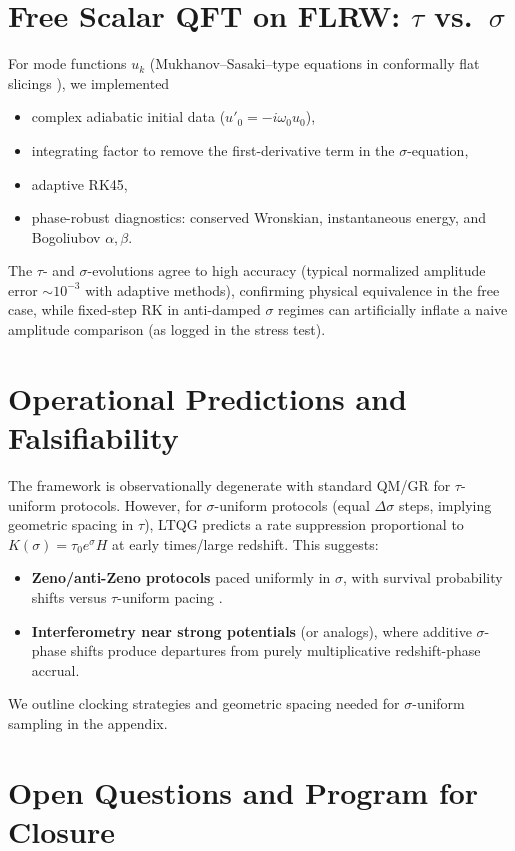 \documentclass[11pt]{article}
\begin{document}
\section{Free Scalar QFT on FLRW: $\tau$ vs.\ $\sigma$}
For mode functions \(u_k\) (Mukhanov–Sasaki–type equations in conformally flat slicings \cite{BirrellDavies,ParkerToms,WaldQFTCST}),
we implemented
\begin{itemize}
\item complex adiabatic initial data (\(u'_0=-i\omega_0 u_0\)),
\item integrating factor to remove the first-derivative term in the $\sigma$-equation,
\item adaptive RK45,
\item phase-robust diagnostics: conserved Wronskian, instantaneous energy, and Bogoliubov \(\alpha,\beta\).
\end{itemize}
The $\tau$- and $\sigma$-evolutions agree to high accuracy (typical normalized amplitude error $\sim 10^{-3}$ with adaptive methods), confirming physical equivalence in the free case, while fixed-step RK in anti-damped $\sigma$ regimes can artificially inflate a naive amplitude comparison (as logged in the stress test).

\section{Operational Predictions and Falsifiability}
The framework is observationally degenerate with standard QM/GR for \(\tau\)-uniform protocols.
However, for \(\sigma\)-uniform protocols (equal \(\Delta\sigma\) steps, implying geometric spacing in \(\tau\)), LTQG predicts a rate suppression proportional to \(K(\sigma)=\tau_0 e^{\sigma}H\) at early times/large redshift. This suggests:
\begin{itemize}
\item \textbf{Zeno/anti-Zeno protocols} paced uniformly in $\sigma$, with survival probability shifts versus $\tau$-uniform pacing \cite{MisraSudarshan}.
\item \textbf{Interferometry near strong potentials} (or analogs), where additive \(\sigma\)-phase shifts produce departures from purely multiplicative redshift-phase accrual.
\end{itemize}
We outline clocking strategies and geometric spacing needed for $\sigma$-uniform sampling in the appendix.

\section{Open Questions and Program for Closure}
\end{document}
